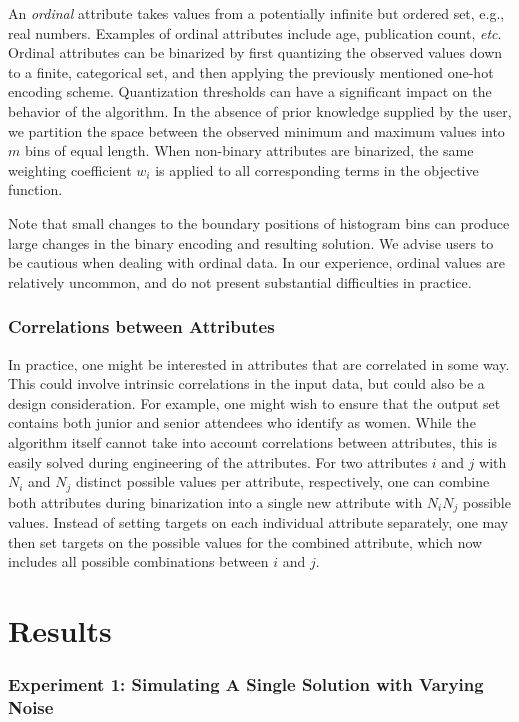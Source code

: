 \documentclass[10pt,letterpaper]{article}
\begin{document}
An \emph{ordinal} attribute takes values from a potentially infinite but ordered set, e.g., real numbers.
Examples of ordinal attributes include age, publication count, \emph{etc}.
Ordinal attributes can be binarized by first quantizing the observed values down to a finite, categorical set, and then applying the previously mentioned one-hot encoding scheme.
Quantization thresholds can have a significant impact on the behavior of the algorithm.
In the absence of prior knowledge supplied by the user, we partition the space between the observed minimum and maximum values into $m$ bins of equal length.
When non-binary attributes are binarized, the same weighting coefficient $w_i$ is applied to all corresponding terms in the objective function.

Note that small changes to the boundary positions of histogram bins can produce large changes in the binary encoding and resulting solution.
We advise users to be cautious when dealing with ordinal data.
In our experience, ordinal values are relatively uncommon, and do not present substantial difficulties in practice.

\subsubsection*{Correlations between Attributes}

In practice, one might be interested in attributes that are correlated in some way. This could involve intrinsic correlations in the input data, but could also be a design consideration. For example, one might wish to ensure that the output set contains both junior and senior attendees who identify as women. While the algorithm itself cannot take into account correlations between attributes, this is easily solved during engineering of the attributes. For two attributes $i$ and $j$ with $N_i$ and $N_j$ distinct possible values per attribute, respectively, one can combine both attributes during binarization into a single new attribute with $N_i N_j$ possible values. Instead of setting targets on each individual attribute separately, one may then set targets on the possible values for the combined attribute, which now includes all possible combinations between $i$ and $j$.  

\section*{Results}
\label{sec:results}
\subsubsection*{Experiment 1: Simulating A Single Solution with Varying Noise}
\label{sec:simulations}
\end{document}
